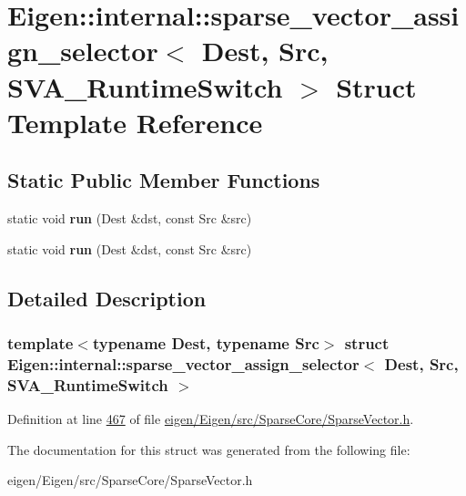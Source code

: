 \hypertarget{struct_eigen_1_1internal_1_1sparse__vector__assign__selector_3_01_dest_00_01_src_00_01_s_v_a___runtime_switch_01_4}{}\section{Eigen\+:\+:internal\+:\+:sparse\+\_\+vector\+\_\+assign\+\_\+selector$<$ Dest, Src, S\+V\+A\+\_\+\+Runtime\+Switch $>$ Struct Template Reference}
\label{struct_eigen_1_1internal_1_1sparse__vector__assign__selector_3_01_dest_00_01_src_00_01_s_v_a___runtime_switch_01_4}
\subsection*{Static Public Member Functions}
\begin{DoxyCompactItemize}
\item 
\mbox{\label{struct_eigen_1_1internal_1_1sparse__vector__assign__selector_3_01_dest_00_01_src_00_01_s_v_a___runtime_switch_01_4_a34ad8123f3a0ebf71a1c2a1e97eb3d34}} 
static void {\bfseries run} (Dest \&dst, const Src \&src)
\item 
\mbox{\label{struct_eigen_1_1internal_1_1sparse__vector__assign__selector_3_01_dest_00_01_src_00_01_s_v_a___runtime_switch_01_4_a34ad8123f3a0ebf71a1c2a1e97eb3d34}} 
static void {\bfseries run} (Dest \&dst, const Src \&src)
\end{DoxyCompactItemize}


\subsection{Detailed Description}
\subsubsection*{template$<$typename Dest, typename Src$>$\newline
struct Eigen\+::internal\+::sparse\+\_\+vector\+\_\+assign\+\_\+selector$<$ Dest, Src, S\+V\+A\+\_\+\+Runtime\+Switch $>$}



Definition at line \hyperlink{eigen_2_eigen_2src_2_sparse_core_2_sparse_vector_8h_source_l00467}{467} of file \hyperlink{eigen_2_eigen_2src_2_sparse_core_2_sparse_vector_8h_source}{eigen/\+Eigen/src/\+Sparse\+Core/\+Sparse\+Vector.\+h}.



The documentation for this struct was generated from the following file\+:\begin{DoxyCompactItemize}
\item 
eigen/\+Eigen/src/\+Sparse\+Core/\+Sparse\+Vector.\+h\end{DoxyCompactItemize}
